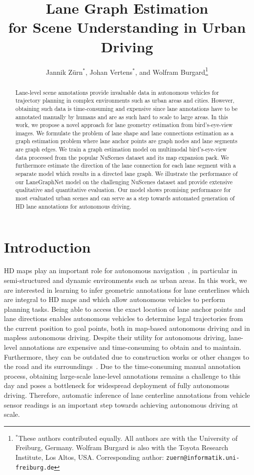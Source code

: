 \documentclass[letterpaper, 10 pt, conference]{ieeeconf}
\title{\LARGE \bf
Lane Graph Estimation \\ for Scene Understanding in Urban Driving}
\author{Jannik Z\"urn$^{*}$, Johan Vertens$^{*}$, and Wolfram Burgard\thanks{$^{*}$These authors contributed equally. All authors are with the University of Freiburg, Germany. Wolfram
Burgard is also with the Toyota Research Institute, Los Altos, USA. Corresponding author: {\tt\small zuern@informatik.uni-freiburg.de}}}
\begin{document}
\maketitle



\thispagestyle{empty}
\pagestyle{empty}



\begin{abstract}
    Lane-level scene annotations provide invaluable data in autonomous vehicles for trajectory planning in complex environments such as urban areas and cities. However, obtaining such data is time-consuming and expensive since lane annotations have to be annotated manually by humans and are as such hard to scale to large areas. In this work, we propose a novel approach for lane geometry estimation from bird's-eye-view images. We formulate the problem of lane shape and lane connections estimation as a graph estimation problem where lane anchor points are graph nodes and lane segments are graph edges. We train a graph estimation model on multimodal bird's-eye-view data processed from the popular NuScenes dataset and its map expansion pack. We furthermore estimate the direction of the lane connection for each lane segment with a separate model which results in a directed lane graph. We illustrate the performance of our LaneGraphNet model on the challenging NuScenes dataset and provide extensive qualitative and quantitative evaluation. Our model shows promising performance for most evaluated urban scenes and can serve as a step towards automated generation of HD lane annotations for autonomous driving.
   \end{abstract}




\section{Introduction}
\label{sec:introduction}

HD maps play an important role for autonomous navigation~\cite{pannen2020keep, kim2021hd}, in particular in semi-structured and dynamic environments such as urban areas. In this work, we are interested in learning to infer geometric annotations for lane centerlines which are integral to HD maps and which allow autonomous vehicles to perform planning tasks. Being able to access the exact location of lane anchor points and lane directions enables autonomous vehicles to determine legal trajectories from the current position to goal points, both in map-based autonomous driving and in mapless autonomous driving. Despite their utility for autonomous driving, lane-level annotations are expensive and time-consuming to obtain and to maintain. Furthermore, they can be outdated due to construction works or other changes to the road and its surroundings~\cite{pannen2020keep}. Due to the time-consuming manual annotation process, obtaining large-scale lane-level annotations remains a challenge to this day and poses a bottleneck for widespread deployment of fully autonomous driving. Therefore, automatic inference of lane centerline annotations from vehicle sensor readings is an important step towards achieving autonomous driving at scale.
\end{document}
